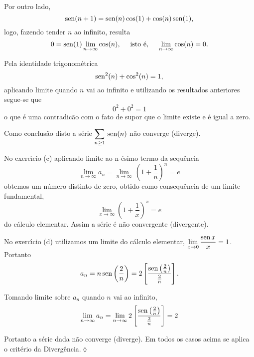 Por outro lado,
\begin{equation*}
    \operatorname{sen}(n+1)=\operatorname{sen}(n)\cos(1)+\cos(n)\operatorname{sen}(1),
\end{equation*}
logo, fazendo tender $n$ ao infinito, resulta
\begin{equation*}
    0=\operatorname{sen}(1)\lim_{n\to\infty}\cos(n),\quad\text{ isto \'{e}, } \quad \lim_{n\to\infty}\cos(n)=0.
\end{equation*}

Pela identidade trigonom\'{e}trica
\begin{equation*}
    \operatorname{sen}^2(n)+\cos^2(n)=1,
\end{equation*}
aplicando limite quando $n$ vai ao infinito e utilizando os
resultados anteriores segue-se que
\begin{equation*}
    0^2+0^2=1
\end{equation*}
o que \'{e} uma contradic\~{a}o com o fato de supor que o limite existe e
\'{e} igual a zero.

Como conclus\~{a}o disto a s\'{e}rie $\displaystyle{\sum_{n\geq1}\,\operatorname{sen}(n)}$ n\~{a}o
converge (diverge).

No exerc\'{\i}cio (c) aplicando limite ao n-\'{e}simo termo da sequ\^{e}ncia
\begin{equation*}
 \lim_{n\to\infty}a_n=\lim_{n\to\infty}\,\left(1+\frac{1}{n}\right)^n=e
\end{equation*}
obtemos um n\'{u}mero distinto de zero, obtido como consequ\^{e}ncia de um
limite fundamental,
\begin{equation*}
    \lim_{x\to\infty}\left(1+\frac{1}{x}\right)^x=e
\end{equation*}
do c\'{a}lculo elementar. Assim a s\'{e}rie \'{e} n\~{a}o convergente
(divergente).

No exerc\'{\i}cio (d) utilizamos um limite do c\'{a}lculo elementar,
$\displaystyle{\lim_{x\to 0}\frac{\operatorname{sen}x}{x}}=1$. Portanto
\begin{equation*}
   a_n=
   n\operatorname{sen}\left(\frac{2}{n}\right)=2\left[\frac{\operatorname{sen}\left(\frac{2}{n}\right)}{\frac{2}{n}}\right].
\end{equation*}

Tomando limite sobre $a_n$ quando $n$ vai ao infinito,
\begin{equation*}
    \lim_{n\to\infty}a_n=\lim_{n\to\infty}2\left[\frac{\operatorname{sen}\left(\frac{2}{n}\right)}{\frac{2}{n}}\right]=2
\end{equation*}

Portanto a s\'{e}rie dada n\~{a}o converge (diverge). Em todos os casos
acima se aplica o crit\'{e}rio da Diverg\^{e}ncia.\hfill \(\lozenge\)


